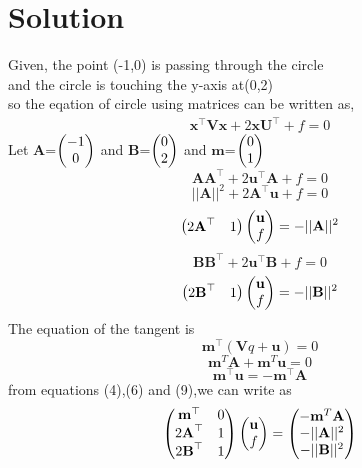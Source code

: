   \section{Solution}
 \begin{center}
     Given,
      the point (-1,0)  is passing through the circle 
      \\ and the circle is touching the y-axis at(0,2)
       \\ so the eqation of circle using matrices can be written as,
       \begin{align}       
\textbf{x}^{\top}\textbf{V}\textbf{x}+2\textbf{x}\textbf{U}^{\top}+f=0
\end{align}
Let $\textbf{A}$=$\begin{pmatrix}-1\\0\end{pmatrix}$ and $\textbf{B}$=$\begin{pmatrix}0\\2\end{pmatrix}$ and  $\textbf{m}$=$\begin{pmatrix}0\\1\end{pmatrix}$
\begin{equation}
        \textbf{A}\textbf{A}^{\top} + 2\textbf{u}^{\top}\textbf{A} + f = 0
\end{equation}
\begin{equation}
        ||{\textbf{A}}||^2 + 2\textbf{A}^{\top} \textbf{u} + f = 0
\end{equation}
\begin{equation}
        \begin{pmatrix}2\textbf{A}^{\top} & 1\end{pmatrix}\begin{pmatrix}\textbf{u} \\ f\end{pmatrix} =-||\textbf{A}||^2
\end{equation}
\begin{equation}
        \textbf{B}\textbf{B}^{\top} + 2\textbf{u}^{\top}\textbf{B} + f = 0
\end{equation}
\begin{equation}
        \begin{pmatrix}2\textbf{B}^{\top} & 1\end{pmatrix}\begin{pmatrix}\textbf{u} \\ f\end{pmatrix} = -||{\textbf{B}}||^2
\end{equation}
The equation of the tangent is
\begin{equation}
        \textbf{m}^{\top} (\textbf{V}q + \textbf{u}) = 0
\end{equation}
\begin{equation}
        \textbf{m}^T\textbf{A} +\textbf{m}^T\textbf{u} = 0
\end{equation}
\begin{equation}
         \textbf{m}^{\top}\textbf{u} = -\textbf{m}^{\top}\textbf{A}
\end{equation}
from equations (4),(6) and (9),we can write as
\begin{equation}
        \myvec{\textbf{m}^{\top} & 0 \\ 2\textbf{A}^{\top} & 1 \\ 2\textbf{B}^{\top} & 1}\myvec{\textbf{u} \\ f} = \myvec{-\textbf{m}^T\textbf{A} \\ -||{\textbf{A}}||^2 \\ -||{\textbf{B}}||^2}

\end{equation}
\end{center}
